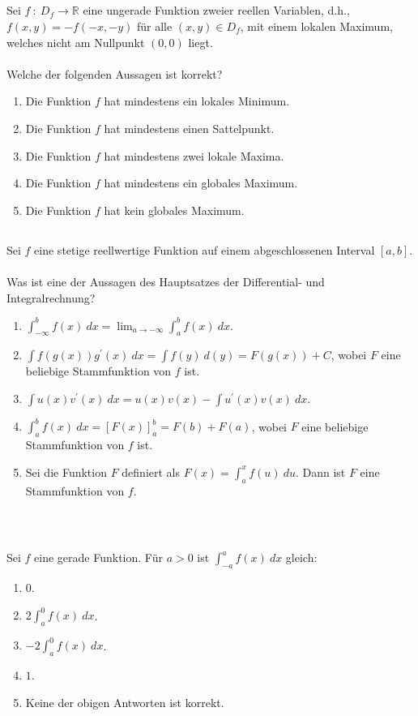 \subsection*{}
Sei $ f \ : \ D_f \to \mathbb{R} $ eine ungerade Funktion zweier reellen Variablen, d.h., $f(x,y) = - f(-x,-y)$ für alle $(x,y) \in D_f$, mit einem lokalen Maximum, welches nicht am Nullpunkt $(0,0)$ liegt.\\
\\ 
Welche der folgenden Aussagen ist korrekt?
\renewcommand{\labelenumi}{(\alph{enumi})}
\begin{enumerate}
\item Die Funktion $f$ hat mindestens ein lokales Minimum.
\item Die Funktion $f$ hat mindestens einen Sattelpunkt.
\item Die Funktion $f$ hat mindestens zwei lokale Maxima.
\item Die Funktion $f$ hat mindestens ein globales Maximum.
\item Die Funktion $f$ hat kein globales Maximum.
\end{enumerate}
\newpage
\subsection*{}
Sei $f$ eine stetige reellwertige Funktion auf einem abgeschlossenen Interval $[a,b]$.\\
\\
Was ist eine der Aussagen des Hauptsatzes der Differential- und Integralrechnung?
\renewcommand{\labelenumi}{(\alph{enumi})}
\begin{enumerate}
\item 
$\int_{-\infty}^b f(x) \ dx = 
\lim_{a \to -\infty} \int_{a}^b f(x) \ dx
$.
\item 
$\int f(g(x)) g^\prime(x) \ dx
= \int f(y) \ d(y)
= F(g(x) ) + C
$, wobei $F$ eine beliebige Stammfunktion von $f$ ist.
\item 
$\int u(x) v^\prime(x) \ dx = u(x) v(x)  - \int u^\prime(x) v(x) \ dx$.
\item 
$\int_a^b f(x) \ dx
=\left[F(x)\right]_a^b= F(b) +F(a)
$, wobei $F$ eine beliebige Stammfunktion von $f$ ist.
\item 
Sei die Funktion $F$ definiert als $F(x) = \int_a^x f(u) \ du$.
Dann ist $F$ eine Stammfunktion von $f$.
\end{enumerate}
\ \\
\subsection*{}
Sei $ f $ eine gerade Funktion.
Für $a > 0$ ist $\int_{-a}^a f(x) \ dx$ gleich:
\renewcommand{\labelenumi}{(\alph{enumi})}
\begin{enumerate}
	\item 
	$ 0 $.
	\item
	$ 2 \int_a^0 f(x) \ dx $.
	\item
	$ -2  \int_a^0 f(x) \ dx$.
	\item
	$ 1 $.
	\item
	Keine der obigen Antworten ist korrekt.
\end{enumerate}
\ \\
